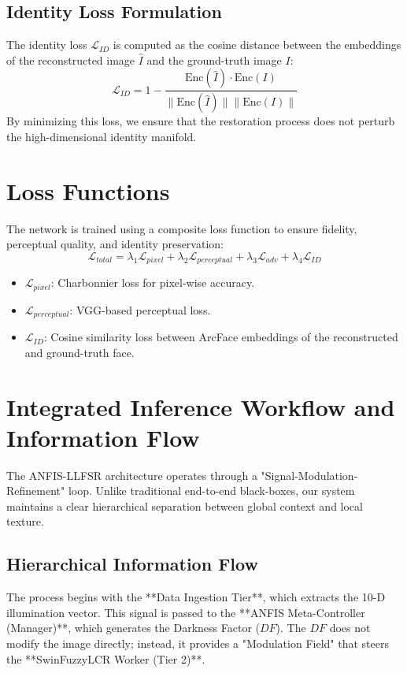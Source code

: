 \subsection{Identity Loss Formulation}
The identity loss $\mathcal{L}_{ID}$ is computed as the cosine distance between the embeddings of the reconstructed image $\hat{I}$ and the ground-truth image $I$:
\begin{equation}
    \mathcal{L}_{ID} = 1 - \frac{\text{Enc}(\hat{I}) \cdot \text{Enc}(I)}{\|\text{Enc}(\hat{I})\| \|\text{Enc}(I)\|}
\end{equation}
By minimizing this loss, we ensure that the restoration process does not perturb the high-dimensional identity manifold.

\section{Loss Functions}
The network is trained using a composite loss function to ensure fidelity, perceptual quality, and identity preservation:
\begin{equation}
    \mathcal{L}_{total} = \lambda_1 \mathcal{L}_{pixel} + \lambda_2 \mathcal{L}_{perceptual} + \lambda_3 \mathcal{L}_{adv} + \lambda_4 \mathcal{L}_{ID}
\end{equation}
\begin{itemize}
    \item $\mathcal{L}_{pixel}$: Charbonnier loss for pixel-wise accuracy.
    \item $\mathcal{L}_{perceptual}$: VGG-based perceptual loss.
    \item $\mathcal{L}_{ID}$: Cosine similarity loss between ArcFace embeddings of the reconstructed and ground-truth face.
\end{itemize}

\section{Integrated Inference Workflow and Information Flow}
The ANFIS-LLFSR architecture operates through a "Signal-Modulation-Refinement" loop. Unlike traditional end-to-end black-boxes, our system maintains a clear hierarchical separation between global context and local texture.

\subsection{Hierarchical Information Flow}
The process begins with the **Data Ingestion Tier**, which extracts the 10-D illumination vector. This signal is passed to the **ANFIS Meta-Controller (Manager)**, which generates the Darkness Factor ($DF$). The $DF$ does not modify the image directly; instead, it provides a "Modulation Field" that steers the **SwinFuzzyLCR Worker (Tier 2)**. 

